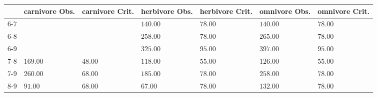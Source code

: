 \begin{table}[ht]
\centering
\begin{tabular}{rllllll}
  \toprule
 & carnivore Obs. & carnivore Crit. & herbivore Obs. & herbivore Crit. & omnivore Obs. & omnivore Crit. \\ 
  \midrule
6-7 &  &  & \(\mathbf{140.00}\) & \(\mathbf{78.00}\) & \(\mathbf{140.00}\) & \(\mathbf{78.00}\) \\ 
  6-8 &  &  & \(\mathbf{258.00}\) & \(\mathbf{78.00}\) & \(\mathbf{265.00}\) & \(\mathbf{78.00}\) \\ 
  6-9 &  &  & \(\mathbf{325.00}\) & \(\mathbf{95.00}\) & \(\mathbf{397.00}\) & \(\mathbf{95.00}\) \\ 
  7-8 & \(\mathbf{169.00}\) & \(\mathbf{48.00}\) & \(\mathbf{118.00}\) & \(\mathbf{55.00}\) & \(\mathbf{126.00}\) & \(\mathbf{55.00}\) \\ 
  7-9 & \(\mathbf{260.00}\) & \(\mathbf{68.00}\) & \(\mathbf{185.00}\) & \(\mathbf{78.00}\) & \(\mathbf{258.00}\) & \(\mathbf{78.00}\) \\ 
  8-9 & \(\mathbf{91.00}\) & \(\mathbf{68.00}\) & 67.00 & 78.00 & \(\mathbf{132.00}\) & \(\mathbf{78.00}\) \\ 
   \bottomrule
\end{tabular}
\end{table}
